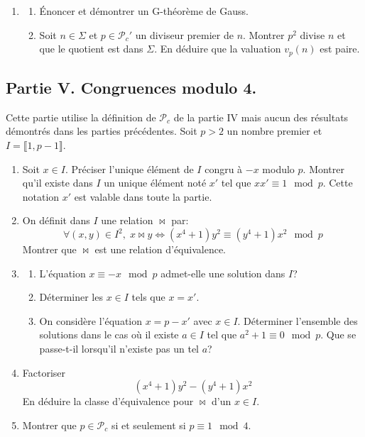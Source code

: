 \begin{enumerate}
\item 
\begin{enumerate}
  \item \'Enoncer et démontrer un G-théorème de Gauss.
  \item Soit $n\in \Sigma$ et $p \in \mathcal{P}_c'$ un diviseur premier de $n$. Montrer $p^2$ divise $n$ et que le quotient est dans $\Sigma$. En déduire que la valuation $v_p(n)$ est paire.
\end{enumerate}

\end{enumerate}

\subsection*{Partie V. Congruences modulo 4.}
Cette partie utilise la définition de $\mathcal{P}_c$ de la partie IV mais aucun des résultats démontrés dans les parties précédentes.\newline
Soit $p>2$ un nombre premier et $I=\llbracket 1, p-1 \rrbracket$.
\begin{enumerate}
  \item Soit $x\in I$.  Préciser l'unique élément de $I$ congru à $-x$ modulo $p$. Montrer qu'il existe dans $I$ un unique élément noté $x'$ tel que $xx'\equiv 1 \mod p$. Cette notation $x'$ est valable dans toute la partie.
  \item On définit dans $I$ une relation $\bowtie$ par:
\begin{displaymath}
  \forall (x,y)\in I^2,\; x \bowtie y \Leftrightarrow (x^4+1)y^2 \equiv (y^4+1)x^2 \mod p
\end{displaymath}
Montrer que $\bowtie$ est une relation d'équivalence.
\item 
\begin{enumerate}
  \item L'équation $x \equiv -x \mod p$ admet-elle une solution dans $I$?
  \item Déterminer les $x\in I$ tels que $x=x'$.
  \item On considère l'équation $x=p-x'$ avec $x\in I$. Déterminer l'ensemble des solutions dans le cas où il existe $a\in I$ tel que $a^2+1\equiv 0 \mod p$.\newline
  Que se passe-t-il lorsqu'il n'existe pas un tel $a$?
\end{enumerate}
\item Factoriser 
\begin{displaymath}
  (x^4+1)y^2 - (y^4+1)x^2
\end{displaymath}
En déduire la classe d'équivalence pour $\bowtie$ d'un $x\in I$.

\item Montrer que $p\in \mathcal{P}_c$ si et seulement si $p\equiv 1 \mod 4$.
\end{enumerate}

